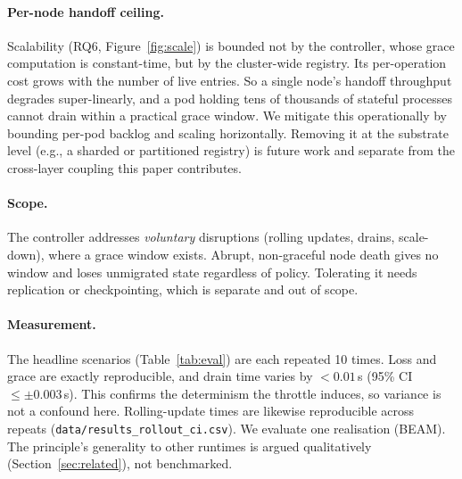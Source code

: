 \documentclass[AMA,Times1COL]{WileyNJDv5}
\begin{document}
\paragraph{Per-node handoff ceiling.} Scalability (RQ6, Figure~\ref{fig:scale}) is bounded not by
the controller, whose grace computation is constant-time, but by the cluster-wide registry. Its
per-operation cost grows with the number of live entries. So a single node's handoff throughput
degrades super-linearly, and a pod holding tens of thousands of stateful processes cannot drain
within a practical grace window. We mitigate this operationally by bounding per-pod backlog and
scaling horizontally. Removing it at the substrate level (e.g., a sharded or partitioned registry)
is future work and separate from the cross-layer coupling this paper contributes.

\paragraph{Scope.} The controller addresses \emph{voluntary} disruptions (rolling updates, drains,
scale-down), where a grace window exists. Abrupt, non-graceful node death gives no window and loses
unmigrated state regardless of policy. Tolerating it needs replication or checkpointing, which is
separate and out of scope.

\paragraph{Measurement.} The headline scenarios (Table~\ref{tab:eval}) are each repeated 10 times.
Loss and grace are exactly reproducible, and drain time varies by $<0.01$\,s (95\% CI $\le\pm0.003$\,s).
This confirms the determinism the throttle induces, so variance is not a confound here. Rolling-update
times are likewise reproducible across repeats (\texttt{data/results\_rollout\_ci.csv}). We evaluate
one realisation (BEAM). The principle's generality to other runtimes is argued qualitatively
(Section~\ref{sec:related}), not benchmarked.
\end{document}
